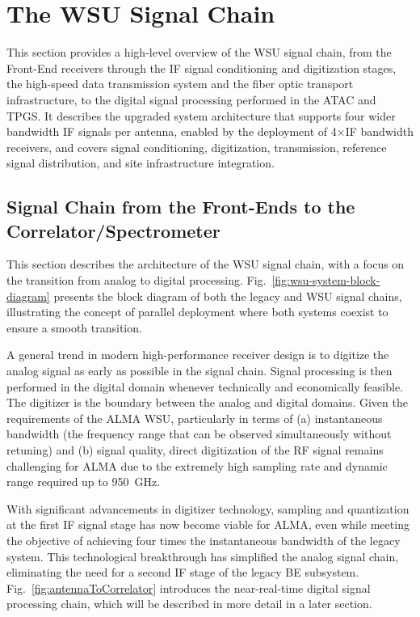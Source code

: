 \section{The WSU Signal Chain}
\label{sec:wsu_signal_chain}

This section provides a high-level overview of the \ac{WSU} signal chain, from the Front-End receivers through the \ac{IF} signal conditioning and digitization stages, the high-speed data transmission system and the fiber optic transport infrastructure, to the digital signal processing performed in the \ac{ATAC} and \ac{TPGS}. 
It describes the upgraded system architecture that supports four wider bandwidth \ac{IF}  signals per antenna, enabled by the deployment of 4$\times$\ac{IF} bandwidth receivers, and covers signal conditioning, digitization, transmission, reference signal distribution, and site infrastructure integration.


\subsection{Signal Chain from the Front-Ends to the Correlator/Spectrometer}
\label{sec:WSUSignalChain}



This section describes the architecture of the \ac{WSU} signal chain, with a focus on the transition from analog to digital processing. Fig.~\ref{fig:wsu-system-block-diagram} presents the block diagram of both the legacy and \ac{WSU} signal chains, illustrating the concept of parallel deployment where both systems coexist to ensure a smooth transition. 

A general trend in modern high-performance receiver design is to digitize the analog signal as early as possible in the signal chain.
Signal processing is then performed in the digital domain whenever technically and economically feasible.
The digitizer is the boundary between the analog and digital domains.
Given the requirements of the ALMA \ac{WSU}, particularly in terms of (a) instantaneous bandwidth (the frequency range that can be observed simultaneously without retuning) and (b) signal quality, direct digitization of the RF signal remains challenging for \ac{ALMA} due to the extremely high sampling rate and dynamic range required up to 950~GHz. 

With significant advancements in digitizer technology, sampling and quantization at the first \ac{IF} signal stage has now become viable for \acs{ALMA}, even while meeting the objective of achieving four times the instantaneous bandwidth of the legacy system.
This technological breakthrough has simplified the analog signal chain, eliminating the need for a second \ac{IF} stage of the legacy \ac{BE} subsystem. Fig.~\ref{fig:antennaToCorrelator} introduces the near-real-time digital signal processing chain, which will be described in more detail in a later section.

